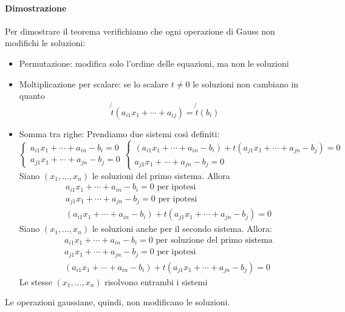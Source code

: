\paragraph{Dimostrazione} Per dimostrare il teorema verifichiamo che ogni
operazione di Gauss non modifichi le soluzioni:
\begin{itemize}
    \item Permutazione: modifica solo l'ordine delle equazioni, ma non le soluzioni
    \item Moltiplicazione per scalare: se lo scalare $t \neq 0$ le soluzioni non
        cambiano in quanto
        \[\not{t}(a_{i1}x_1 + \cdots + a_{ij}) = \not{t}(b_i)\]
    \item Somma tra righe: Prendiamo due sistemi così definiti:
        \[
            \begin{cases}
                a_{i1}x_1 + \cdots + a_{in} - b_i = 0 \\
                a_{j1}x_1 + \cdots + a_{jn} - b_j = 0
            \end{cases}
            \begin{cases}
                (a_{i1}x_1 + \cdots + a_{in} - b_i) + t(a_{j1}x_1 + \cdots + a_{jn} - b_j) = 0 \\
                a_{j1}x_1 + \cdots + a_{jn} - b_j = 0
            \end{cases}
        \]
        Siano $(x_1, \ldots, x_n)$ le soluzioni del primo sistema. Allora
        \begin{align*}
            &a_{i1}x_1 + \cdots + a_{in} - b_i = 0 \text{ per ipotesi}\\
            &a_{j1}x_1 + \cdots + a_{jn} - b_j = 0 \text{ per ipotesi}\\
            &(a_{i1}x_1 + \cdots + a_{in} - b_i) + t(a_{j1}x_1 + \cdots + a_{jn} - b_j) = 0
        \end{align*}
        Siano $(x_1, \ldots, x_n)$ le soluzioni anche per il secondo sistema.
        Allora:
        \begin{align*}
            &a_{i1}x_1 + \cdots + a_{in} - b_i = 0 \text{ per soluzione del primo sistema}\\
            &a_{j1}x_1 + \cdots + a_{jn} - b_j = 0 \text{ per ipotesi}\\
            &(a_{i1}x_1 + \cdots + a_{in} - b_i) + t(a_{j1}x_1 + \cdots + a_{jn} - b_j) = 0
        \end{align*}
        Le stesse $(x_1, \ldots, x_n)$ risolvono entrambi i sistemi
\end{itemize}
Le operazioni gaussiane, quindi, non modificano le soluzioni.

